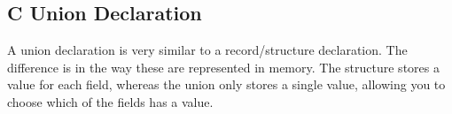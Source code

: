 \clearpage
\subsection{C Union Declaration} %
\label{sub:c_union_declaration}

A union declaration is very similar to a record/structure declaration. The difference is in the way these are represented in memory. The structure stores a value for each field, whereas the union only stores a single value, allowing you to choose which of the fields has a value.


\begin{figure}
\end{figure}

